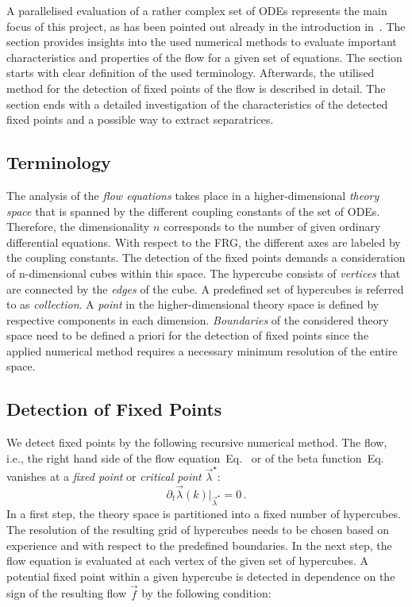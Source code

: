\documentclass[paper=a4,11pt,bibliography=totoc]{scrartcl}
\def\eq#1{\textcolor{red!50!black}{Eq.}~\labelcref{#1}}
\begin{document}
A parallelised evaluation of a rather complex set of ODEs represents the main focus of this project, as has been pointed out already in the introduction in~. The section provides insights into the used numerical methods to evaluate important characteristics and properties of the flow for a given set of equations. The section starts with clear definition of the used terminology. Afterwards, the utilised method for the detection of fixed points of the flow is described in detail. The section ends with a detailed investigation of the characteristics of the detected fixed points and a possible way to extract separatrices.

\subsection{Terminology}

The analysis of the \textit{flow equations} takes place in a higher-dimensional \textit{theory space} that is spanned by the different coupling constants of the set of ODEs. Therefore, the dimensionality $n$ corresponds to the number of given ordinary differential equations. With respect to the FRG, the different axes are labeled by the coupling constants. The detection of the fixed points demands a consideration of n-dimensional cubes within this space. The hypercube consists of \textit{vertices} that are connected by the \textit{edges} of the cube. A predefined set of hypercubes is referred to as \textit{collection}. A \textit{point} in the higher-dimensional theory space is defined by respective components in each dimension. \textit{Boundaries} of the considered theory space need to be defined a priori for the detection of fixed points since the applied numerical method requires a necessary minimum resolution of the entire space.

\subsection{Detection of Fixed Points}
\label{sec:DetectionOfFixedPoints}

We detect fixed points by the following recursive numerical method. The flow, i.e., the right hand side of the flow equation~\eq{eq:vecflowequation} or of the beta function~\eq{eq:betafunction} vanishes at a \textit{fixed point} or \textit{critical point} $\vec{\lambda}^\star$:
%
\begin{equation}
\partial_t \vec{\lambda}(k)\bigg|_{\vec{\lambda}^\star}=0\,.
\end{equation}
%
In a first step, the theory space is partitioned into a fixed number of hypercubes. The resolution of the resulting grid of hypercubes needs to be chosen based on experience and with respect to the predefined boundaries. In the next step, the flow equation is evaluated at each vertex of the given set of hypercubes. A potential fixed point within a given hypercube is detected in dependence on the sign of the resulting flow $\vec{f}$ by the following condition:
\end{document}
